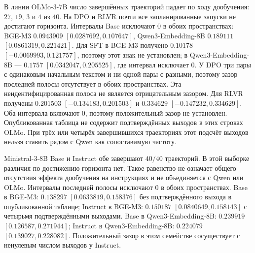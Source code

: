 \documentclass[10pt]{article}
\begin{document}
В линии OLMo-3-7B число завершённых траекторий падает по ходу дообучения:
$27$, $19$, $3$ и $4$ из $40$. %
На DPO и RLVR почти все запланированные запуски не достигают горизонта.
Интервалы Base исключают $0$ в обоих пространствах:
BGE-M3 $0.0943909$ $[0.0287692, 0.107647]$, %
Qwen3-Embedding-8B $0.189111$ $[0.0861319, 0.221421]$. %
Для SFT в BGE-M3 получено $0.10178$ $[-0.0069993, 0.121757]$,
поэтому этот знак не установлен; в Qwen3-Embedding-8B ---
$0.1757$ $[0.0342047, 0.205525]$, где интервал исключает $0$. %
У DPO три пары с одинаковым начальным текстом и ни одной пары с разными,
поэтому зазор последней полосы отсутствует в обоих пространствах. %
Эта неидентифицированная полоса не является отрицательным зазором.
Для RLVR получены $0.201503$ $[-0.134183, 0.201503]$ и
$0.334629$ $[-0.147232, 0.334629]$. %
Оба интервала включают $0$, поэтому положительный зазор не установлен.
Опубликованная таблица не содержит подтверждённых выходов
в этих строках OLMo.
При трёх или четырёх завершившихся траекториях этот подсчёт выходов
нельзя ставить рядом с Qwen как сопоставимую частоту.

Ministral-3-8B Base и Instruct обе завершают $40/40$ траекторий. %
В этой выборке различия по достижению горизонта нет.
Такое равенство не означает общего отсутствия эффекта дообучения
на инструкциях и не объединяется с Qwen или OLMo.
Интервалы последней полосы исключают $0$ в обоих пространствах.
Base в BGE-M3: $0.138297$ $[0.0633819, 0.158376]$
без подтверждённого выхода в опубликованной таблице; %
Instruct в BGE-M3: $0.150187$ $[0.0840649, 0.158143]$
с четырьмя подтверждёнными выходами. %
Base в Qwen3-Embedding-8B: $0.239919$ $[0.126587, 0.271944]$; %
Instruct в Qwen3-Embedding-8B: $0.224079$ $[0.139027, 0.228082]$. %
Положительный зазор в этом семействе сосуществует с ненулевым
числом выходов у Instruct.
\end{document}
